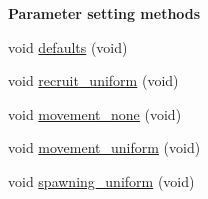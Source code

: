 \begin{Indent}{\bf Parameter setting methods}\par
\begin{DoxyCompactItemize}
\item 
void \hyperlink{classIOSKJ_1_1Model_a2018db7a3e7780fddc161f026dd35c4e}{defaults} (void)
\item 
void \hyperlink{classIOSKJ_1_1Model_a53443d7a0b8ac5f00918023cd232de8d}{recruit\-\_\-uniform} (void)
\item 
void \hyperlink{classIOSKJ_1_1Model_ac65da2c311c6b0a840755af4d3ec17ea}{movement\-\_\-none} (void)
\item 
void \hyperlink{classIOSKJ_1_1Model_a0278c3e4893f0891856dc4df93d3306f}{movement\-\_\-uniform} (void)
\item 
void \hyperlink{classIOSKJ_1_1Model_ae04fad38e291a476bec70ff67bbfd9b6}{spawning\-\_\-uniform} (void)
\end{DoxyCompactItemize}
\end{Indent}
